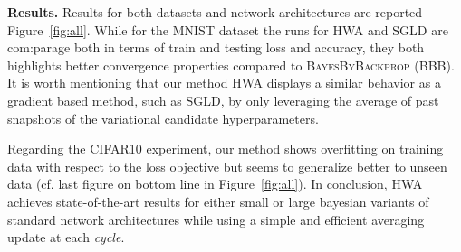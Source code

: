 \documentclass{article} %
\begin{document}
\textbf{Results.} \hspace{0.1in} 
Results for both datasets and network architectures are reported Figure~\ref{fig:all}.
While for the MNIST dataset the runs for \textsc{HWA} and \textsc{SGLD} are com:parage both in terms of train and testing loss and accuracy, they both highlights better convergence properties compared to \textsc{BayesByBackprop} (BBB).
It is worth mentioning that our method \textsc{HWA} displays a similar behavior as a gradient based method, such as \textsc{SGLD}, by only leveraging the average of past snapshots of the variational candidate hyperparameters. 

Regarding the CIFAR10 experiment, our method shows overfitting on training data with respect to the loss objective but seems to generalize better to unseen data (cf. last figure on bottom line in Figure~\ref{fig:all}).
In conclusion, \textsc{HWA} achieves state-of-the-art results for either small or large bayesian variants of standard network architectures while using a simple and efficient averaging update at each \textit{cycle}.
\end{document}
